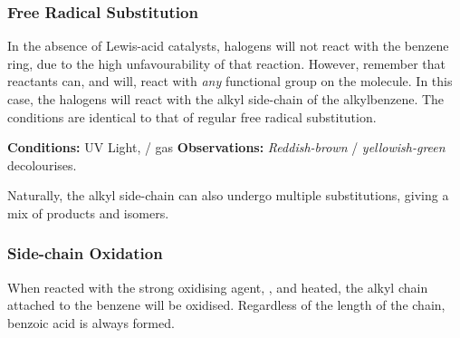 
		\pagebreak
		\subsubsection{Free Radical Substitution}

			In the absence of Lewis-acid catalysts, halogens will not react with the benzene ring, due to the high unfavourability of
			that reaction. However, remember that reactants can, and will, react with \textit{any} functional group on the molecule. In
			this case, the halogens will react with the alkyl side-chain of the alkylbenzene. The conditions are identical to that of
			regular free radical substitution.

			\vspace{1.5em}

			\vbox{\textbf{Conditions:} \tabto{35mm}UV Light,  /  gas}	%
			\vbox{\textbf{Observations:} \tabto{35mm}\textit{\color{Mahogany}Reddish-brown}  / \textit{\color{YellowGreen}yellowish-green}  decolourises.}


			Naturally, the alkyl side-chain can also undergo multiple substitutions, giving a mix of products and isomers.



		\subsubsection{Side-chain Oxidation}

			When reacted with the strong oxidising agent, , and heated, the alkyl chain attached to the benzene will be oxidised.
			Regardless of the length of the chain, benzoic acid is always formed.

			\vspace{1.5em}

